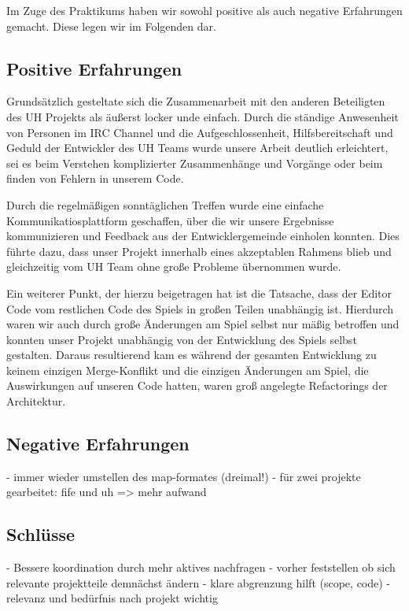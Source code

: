 Im Zuge des Praktikums haben wir sowohl positive als auch negative Erfahrungen
gemacht. Diese legen wir im Folgenden dar.

\subsection{Positive Erfahrungen}
Grundsätzlich gesteltate sich die Zusammenarbeit mit den anderen Beteiligten
des UH Projekts als äußerst locker unde einfach. Durch die ständige Anwesenheit
von Personen im IRC Channel und die Aufgeschlossenheit, Hilfsbereitschaft und
Geduld der Entwickler des UH Teams wurde unsere Arbeit deutlich erleichtert,
sei es beim Verstehen komplizierter Zusammenhänge und Vorgänge oder beim
finden von Fehlern in unserem Code.

Durch die regelmäßigen sonntäglichen Treffen wurde eine einfache
Kommunikatiosplattform geschaffen, über die wir unsere Ergebnisse kommunizieren
und Feedback aus der Entwicklergemeinde einholen konnten. Dies führte dazu,
dass unser Projekt innerhalb eines akzeptablen Rahmens blieb und gleichzeitig
vom UH Team ohne große Probleme übernommen wurde.

Ein weiterer Punkt, der hierzu beigetragen hat ist die Tatsache, dass der
Editor Code vom restlichen Code des Spiels in großen Teilen unabhängig ist.
Hierdurch waren wir auch durch große Änderungen am Spiel selbst nur
mäßig betroffen und konnten unser Projekt unabhängig von der Entwicklung
des Spiels selbst gestalten. Daraus resultierend kam es während der gesamten
Entwicklung zu keinem einzigen Merge-Konflikt
und die einzigen Änderungen am Spiel, die Auswirkungen auf unseren Code hatten,
waren groß angelegte Refactorings der Architektur.

\subsection{Negative Erfahrungen}
- immer wieder umstellen des map-formates (dreimal!)
- für zwei projekte gearbeitet: fife und uh => mehr aufwand

\subsection{Schlüsse}
- Bessere koordination durch mehr aktives nachfragen
- vorher feststellen ob sich relevante projektteile demnächst ändern
- klare abgrenzung hilft (scope, code)
- relevanz und bedürfnis nach projekt wichtig


